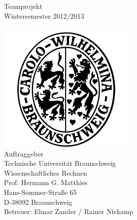 

\thispagestyle{plain}      %

\begin{titlepage}

\begin{center}

{}\\[3ex]%

{}\\[3ex]%

Teamprojekt\\
Wintersemester 2012/2013\\[4ex]%

{}\\[4ex]%

\includegraphics[scale=0.8]{bilder/carolo.jpg}\\[4ex]%

Auftraggeber\\
Technische Universität Braunschweig\\
Wissenschaftliches Rechnen\\
Prof. Hermann G. Matthies\\
Hans-Sommer-Straße 65\\
D-38092 Braunschweig\\[1ex]%
Betreuer: Elmar Zander / Rainer Niekamp\\[4ex]%


\end{center}
\end{titlepage}

